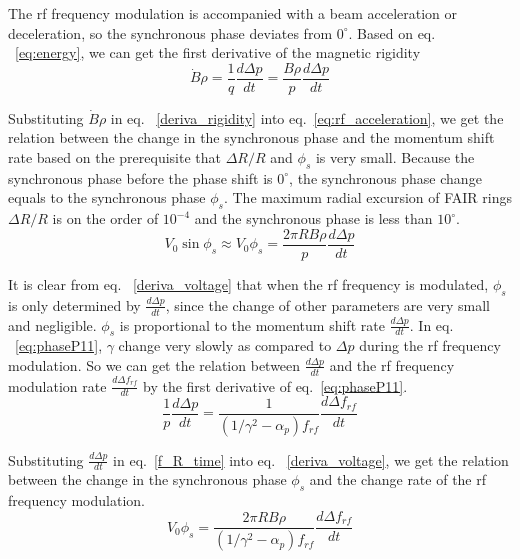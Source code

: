 \begin{itemize}
The rf frequency modulation is accompanied with a beam acceleration or deceleration, so the synchronous phase deviates from $0^\circ$. Based on eq. ~\ref{eq:energy}, we can get the first derivative of the magnetic rigidity
\begin{equation}
	\label{deriva_rigidity}
	\dot{B}\rho =\frac{1}{q}\frac{d \Delta p}{dt}=\frac{B\rho}{p}\frac{d \Delta p}{dt}
\end{equation}

Substituting $\dot{B}\rho$ in eq. ~\ref{deriva_rigidity} into eq.~\ref{eq:rf_acceleration}, we get the relation between the change in the synchronous phase and the momentum shift rate based on the prerequisite that $\Delta R/R$ and $\phi_s$ is very small. Because the synchronous phase before the phase shift is $0^\circ$, the synchronous phase change equals to the synchronous phase $\phi_{s}$. The maximum radial excursion of FAIR rings $\Delta R/R$ is on the order of $10^{-4}$ and the synchronous phase is less than $10^\circ$.
\begin{equation}
\label{deriva_voltage}
V_0\sin\phi_s\approx V_0\phi_s=\frac{2\pi R B\rho}{p} \frac{d \Delta p}{dt}
\end{equation} 

It is clear from eq. ~\ref{deriva_voltage} that when the rf frequency is modulated, $\phi_s$ is only determined by $\frac{d \Delta p}{dt}$, since the change of other parameters are very small and negligible. $\phi_s$ is proportional to the momentum shift rate $\frac{d \Delta p}{dt}$. In eq. ~\ref{eq:phaseP11}, $\gamma$ change very slowly as compared to $\Delta p$ during the rf frequency modulation. So we can get the relation between $\frac{d \Delta p}{dt}$ and the rf frequency modulation rate $\frac{d \Delta f_\mathit{rf}}{dt}$ by the first derivative of eq.~\ref{eq:phaseP11}. 
\begin{equation}
\label{f_R_time}
\frac{1}{p}\frac{d \Delta p}{dt}=\frac{1}{(1/\gamma^2-\alpha_p)f_\mathit{rf}}\frac{d \Delta f_\mathit{rf}}{dt}
\end{equation} 

Substituting $\frac{d \Delta p}{dt}$ in eq.~\ref{f_R_time} into eq. ~\ref{deriva_voltage}, we get the relation between the change in the synchronous phase $\phi_{s}$ and the change rate of the rf frequency modulation.
\begin{equation}
\label{syn_phase}
V_0\phi_s=\frac{2\pi R B\rho}{(1/\gamma^2-\alpha_p)f_\mathit{rf}} \frac{d \Delta f_\mathit{rf}}{dt}
\end{equation} 


\end{itemize}
